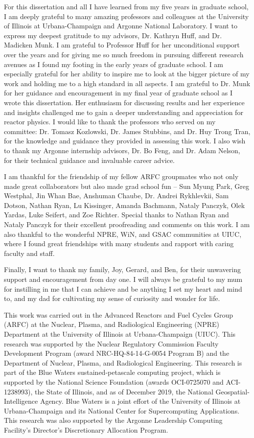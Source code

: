 For this dissertation and all I have learned from my five years in graduate school, 
I am deeply grateful to many amazing professors and colleagues at the University of 
Illinois at Urbana-Champaign and Argonne National Laboratory. 
I want to express my deepest gratitude to my advisors, Dr. Kathryn Huff, and Dr. 
Madicken Munk. 
I am grateful to Professor Huff for her unconditional support over the years and for 
giving me so much freedom in pursuing different research avenues as I found my footing 
in the early years of graduate school. 
I am especially grateful for her ability to inspire me to look at the bigger picture of 
my work and holding me to a high standard in all aspects.
I am grateful to Dr. Munk for her guidance and encouragement in my final year 
of graduate school as I wrote this dissertation. 
Her enthusiasm for discussing results and her experience and insights challenged me to 
gain a deeper understanding and appreciation for reactor physics.  
I would like to thank the professors who served on my committee: Dr. Tomasz 
Kozlowski, Dr. James Stubbins, and Dr. Huy Trong Tran, for the knowledge and guidance 
they provided in assessing this work. 
I also wish to thank my Argonne internship advisors, Dr. Bo Feng, and Dr. Adam Nelson, 
for their technical guidance and invaluable career advice. 

I am thankful for the friendship of my fellow ARFC groupmates who not only made great 
collaborators but also made grad school fun -- Sun Myung Park, Greg Westphal, 
Jin Whan Bae, Anshuman Chaube, Dr. Andrei Rykhlevkii, Sam Dotson, Nathan Ryan, 
Lu Kissinger, Amanda Bachmann, Nataly Panczyk, Olek Yardas, Luke Seifert, and Zoe Richter. 
Special thanks to Nathan Ryan and Nataly Panczyk for their excellent proofreading 
and comments on this work. 
I am also thankful to the wonderful NPRE, WiN, and GSAC communities at UIUC, where 
I found great friendships with many students and rapport with caring faculty and staff. 

Finally, I want to thank my family, Joy, Gerard, and Ben, for their unwavering support 
and encouragement from day one. 
I will always be grateful to my mum for instilling in me that I can achieve and be 
anything I set my heart and mind to, and my dad for cultivating my sense of curiosity 
and wonder for life.

This work was carried out in the Advanced Reactors and Fuel Cycles Group (ARFC) at the 
Nuclear, Plasma, and Radiological Engineering (NPRE) Department at the University of 
Illinois at Urbana-Champaign (UIUC). 
This research was supported by the Nuclear Regulatory Commission Faculty Development 
Program (award NRC-HQ-84-14-G-0054 Program B) and the Department of Nuclear, Plasma, 
and Radiological Engineering.
This research is part of the Blue Waters sustained-petascale computing project, 
which is supported by the National Science Foundation (awards OCI-0725070 and 
ACI-1238993), the State of Illinois, and as of December 2019, the National 
Geospatial-Intelligence Agency. 
Blue Waters is a joint effort of the University of Illinois at Urbana-Champaign and 
its National Center for Supercomputing Applications.
This research was also supported by the Argonne Leadership Computing Facility's 
Director's Discretionary Allocation Program. 